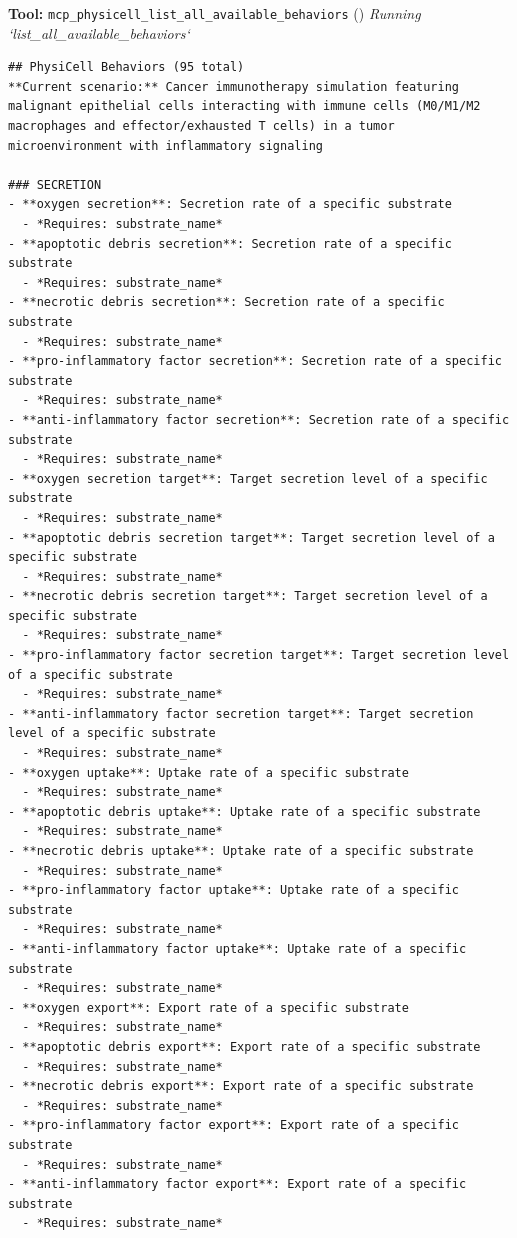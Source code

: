 \documentclass[11pt,a4paper]{article}
\begin{document}
\begin{toolokbox}
\textbf{Tool:} \texttt{mcp\_physicell\_list\_all\_available\_behaviors} (\checkmark)
\textit{Running `list\_all\_available\_behaviors`}
\begin{lstlisting}
## PhysiCell Behaviors (95 total)
**Current scenario:** Cancer immunotherapy simulation featuring malignant epithelial cells interacting with immune cells (M0/M1/M2 macrophages and effector/exhausted T cells) in a tumor microenvironment with inflammatory signaling

### SECRETION
- **oxygen secretion**: Secretion rate of a specific substrate
  - *Requires: substrate_name*
- **apoptotic debris secretion**: Secretion rate of a specific substrate
  - *Requires: substrate_name*
- **necrotic debris secretion**: Secretion rate of a specific substrate
  - *Requires: substrate_name*
- **pro-inflammatory factor secretion**: Secretion rate of a specific substrate
  - *Requires: substrate_name*
- **anti-inflammatory factor secretion**: Secretion rate of a specific substrate
  - *Requires: substrate_name*
- **oxygen secretion target**: Target secretion level of a specific substrate
  - *Requires: substrate_name*
- **apoptotic debris secretion target**: Target secretion level of a specific substrate
  - *Requires: substrate_name*
- **necrotic debris secretion target**: Target secretion level of a specific substrate
  - *Requires: substrate_name*
- **pro-inflammatory factor secretion target**: Target secretion level of a specific substrate
  - *Requires: substrate_name*
- **anti-inflammatory factor secretion target**: Target secretion level of a specific substrate
  - *Requires: substrate_name*
- **oxygen uptake**: Uptake rate of a specific substrate
  - *Requires: substrate_name*
- **apoptotic debris uptake**: Uptake rate of a specific substrate
  - *Requires: substrate_name*
- **necrotic debris uptake**: Uptake rate of a specific substrate
  - *Requires: substrate_name*
- **pro-inflammatory factor uptake**: Uptake rate of a specific substrate
  - *Requires: substrate_name*
- **anti-inflammatory factor uptake**: Uptake rate of a specific substrate
  - *Requires: substrate_name*
- **oxygen export**: Export rate of a specific substrate
  - *Requires: substrate_name*
- **apoptotic debris export**: Export rate of a specific substrate
  - *Requires: substrate_name*
- **necrotic debris export**: Export rate of a specific substrate
  - *Requires: substrate_name*
- **pro-inflammatory factor export**: Export rate of a specific substrate
  - *Requires: substrate_name*
- **anti-inflammatory factor export**: Export rate of a specific substrate
  - *Requires: substrate_name*


\end{lstlisting}
\end{toolokbox}
\end{document}
